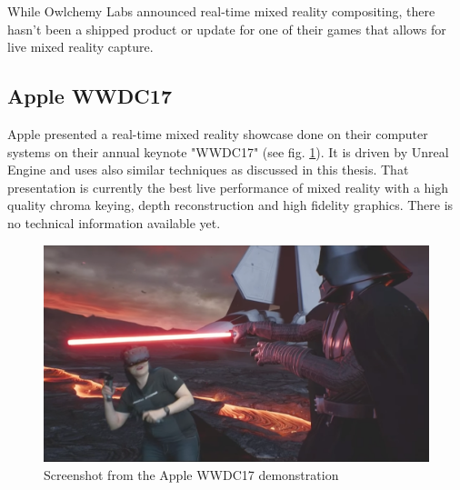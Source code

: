 While Owlchemy Labs announced real-time mixed reality compositing, there hasn't 
been a shipped product or update for one of their games that allows for live 
mixed reality capture\cite{owlchemy:mr:3:2017}.

\newpage
\subsection{Apple WWDC17}

Apple presented a real-time mixed reality showcase done on their computer 
systems on their annual keynote "WWDC17" (see fig. 
\ref{fig:mrproduction:apple}). It is driven by Unreal Engine and 
uses also similar techniques as discussed in this thesis. That presentation is 
currently the best live performance of mixed reality with a high quality chroma 
keying, depth reconstruction and high fidelity graphics. There is no technical 
information available yet\cite{ilmxlab:mr-demo:2017}.

\begin{figure}[htb]
	\centering
	\includegraphics[width=\textwidth]{_external/media/apple-mr.png}
	\caption{Screenshot from the Apple WWDC17 
	demonstration\cite{ilmxlab:mr-demo:2017}}
	\label{fig:mrproduction:apple}
\end{figure}